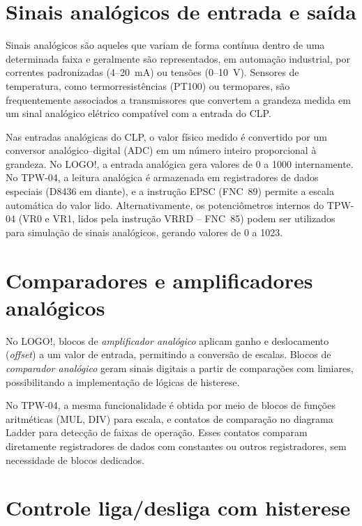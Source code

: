 \documentclass[
  12pt,
  openright,
  oneside,
  a4paper,
  chapter=TITLE,
  section=TITLE,
  brazilian
]{abntex2}
\begin{document}
\section{Sinais anal\'{o}gicos de entrada e sa\'{i}da}

Sinais anal\'{o}gicos s\~{a}o aqueles que variam de forma cont\'{i}nua dentro de uma determinada faixa e geralmente s\~{a}o representados, em automa\c{c}\~{a}o industrial, por correntes padronizadas (4--20~mA) ou tens\~{o}es (0--10~V). Sensores de temperatura, como termorresist\^{e}ncias (PT100) ou termopares, s\~{a}o frequentemente associados a transmissores que convertem a grandeza medida em um sinal anal\'{o}gico el\'{e}trico compat\'{i}vel com a entrada do CLP.

Nas entradas anal\'{o}gicas do CLP, o valor f\'{i}sico medido \'{e} convertido por um conversor anal\'{o}gico--digital (ADC) em um n\'{u}mero inteiro proporcional \`{a} grandeza. No LOGO!, a entrada anal\'{o}gica gera valores de 0 a 1000 internamente. No TPW-04, a leitura anal\'{o}gica \'{e} armazenada em registradores de dados especiais (D8436 em diante), e a instru\c{c}\~{a}o EPSC (FNC~89) permite a escala autom\'{a}tica do valor lido. Alternativamente, os potenci\^{o}metros internos do TPW-04 (VR0 e VR1, lidos pela instru\c{c}\~{a}o VRRD -- FNC~85) podem ser utilizados para simula\c{c}\~{a}o de sinais anal\'{o}gicos, gerando valores de 0 a 1023.

\section{Comparadores e amplificadores anal\'{o}gicos}

No LOGO!, blocos de \textit{amplificador anal\'{o}gico} aplicam ganho e deslocamento (\textit{offset}) a um valor de entrada, permitindo a convers\~{a}o de escalas. Blocos de \textit{comparador anal\'{o}gico} geram sinais digitais a partir de compara\c{c}\~{o}es com limiares, possibilitando a implementa\c{c}\~{a}o de l\'{o}gicas de histerese.

No TPW-04, a mesma funcionalidade \'{e} obtida por meio de blocos de fun\c{c}\~{o}es aritm\'{e}ticas (MUL, DIV) para escala, e contatos de compara\c{c}\~{a}o no diagrama Ladder para detec\c{c}\~{a}o de faixas de opera\c{c}\~{a}o. Esses contatos comparam diretamente registradores de dados com constantes ou outros registradores, sem necessidade de blocos dedicados.

\section{Controle liga/desliga com histerese}
\end{document}
